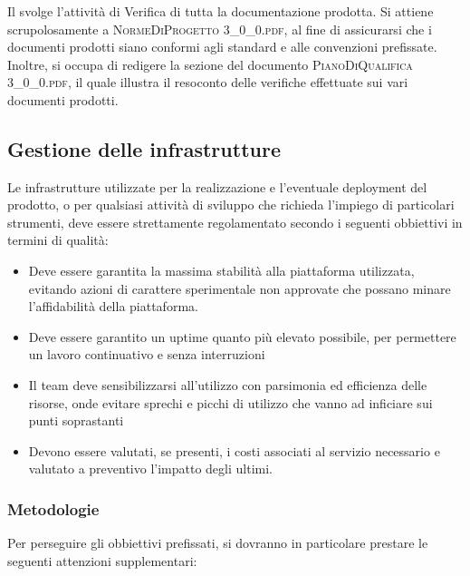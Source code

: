 		\subsubsection{\Ver}
		Il \textit{\Ver} svolge l'attività di Verifica di tutta la documentazione prodotta. Si attiene scrupolosamente a \textsc{NormeDiProgetto 3\_0\_0.pdf}, al fine di assicurarsi che i documenti prodotti siano conformi agli standard e alle convenzioni prefissate.\\
		Inoltre, si occupa di redigere la sezione del documento \textsc{PianoDiQualifica 3\_0\_0.pdf}, il quale illustra il resoconto delle verifiche effettuate sui vari documenti prodotti.

	\newpage
	\subsection{Gestione delle infrastrutture}
	Le infrastrutture utilizzate per la realizzazione e l'eventuale deployment del prodotto, o per qualsiasi attività di sviluppo che richieda l'impiego di particolari strumenti, deve essere strettamente regolamentato secondo i seguenti obbiettivi in termini di qualità:
	
	\begin{itemize}
		\item Deve essere garantita la massima stabilità alla piattaforma utilizzata, evitando azioni di carattere sperimentale non approvate che possano minare l'affidabilità della piattaforma.
		\item Deve essere garantito un uptime quanto più elevato possibile, per permettere un lavoro continuativo e senza interruzioni
		\item Il team deve sensibilizzarsi all'utilizzo con parsimonia ed efficienza delle risorse, onde evitare sprechi e picchi di utilizzo che vanno ad inficiare sui punti soprastanti
		\item Devono essere valutati, se presenti, i costi associati al servizio necessario e valutato a preventivo l'impatto degli ultimi.
	\end{itemize}

	\subsubsection{Metodologie}
	Per perseguire gli obbiettivi prefissati, si dovranno in particolare prestare le seguenti attenzioni supplementari:
	
